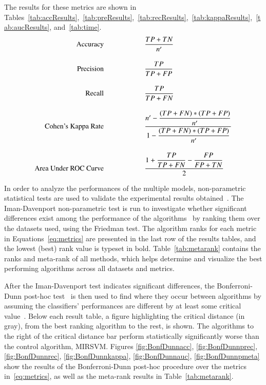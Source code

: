 \documentclass[preprint,12pt]{elsarticle}
\newcommand\tab[1][1cm]{\hspace*{#1}}
\begin{document}
The results for these metrics are shown in Tables~\ref{tab:accResults},~\ref{tab:preResults},~\ref{tab:recResults},~\ref{tab:kappaResults},~\ref{tab:aucResults}, and~\ref{tab:time}.
\begin{subequations}
\label{eq:metrics}
\begin{align}
\text{Accuracy} \tab \tab &\dfrac{TP+TN}{n^\prime} \label{eq:accuracy}\\[10pt]
\text{Precision} \tab \tab &\dfrac{TP}{TP+FP} \label{eq:precision}\\[10pt]
\text{Recall} \tab \tab &\dfrac{TP}{TP+FN} \label{eq:recall}\\[10pt]
\text{Cohen's Kappa Rate} \tab \tab &\dfrac{n^\prime - \dfrac{(TP+FN)*(TP+FP)}{n^\prime}}{1 - \dfrac{(TP+FN)*(TP+FP)}{n^\prime}} \label{eq:kappa}\\[10pt]
\text{Area Under ROC Curve} \tab \tab &\frac{1 + \dfrac{TP}{TP+FN} - \dfrac{FP}{FP+TN}}{2} \label{eq:auc}
\end{align}
\end{subequations}

In order to analyze the performances of the multiple models, non-parametric statistical tests are used to validate the experimental results obtained~\citep{Derrac2011,Garcia20102044}. The Iman-Davenport non-parametric test is run to investigate whether significant differences exist among the performance of the algorithms~\citep{Garcia2008} by ranking them over the datasets used, using the Friedman test. The algorithm ranks for each metric in Equations~\eqref{eq:metrics} are presented in the last row of the results tables, and the lowest (best) rank value is typeset in bold. Table~\ref{tab:metarank} contains the ranks and meta-rank of all methods, which helps determine and visualize the best performing algorithms across all datasets and metrics. 

After the Iman-Davenport test indicates significant differences, the Bonferroni-Dunn post-hoc test~\citep{Dunn1961} is then used to find where they occur between algorithms by assuming the classifiers' performances are different by at least some critical value~\citep{Garcia2009}. Below each result table, a figure highlighting the critical distance (in gray), from the best ranking algorithm to the rest, is shown. The algorithms to the right of the critical distance bar perform statistically significantly worse than the control algorithm, MIRSVM. Figures \ref{fig:BonfDunnacc}, \ref{fig:BonfDunnprec}, \ref{fig:BonfDunnrec}, \ref{fig:BonfDunnkappa}, \ref{fig:BonfDunnauc}, \ref{fig:BonfDunnpmeta} show the results of the Bonferroni-Dunn post-hoc procedure over the metrics in~\eqref{eq:metrics}, as well as the meta-rank results in Table~\ref{tab:metarank}.
\end{document}
